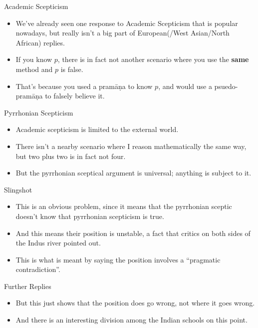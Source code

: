 \documentclass[
  17pt,
  letterpaper,
  ignorenonframetext,
  aspectratio=169,
]{beamer}
\providecommand{\tightlist}{%
  \setlength{\itemsep}{0pt}\setlength{\parskip}{0pt}}\usepackage{longtable,booktabs,array}
\begin{document}
\begin{frame}{Academic Scepticism}
\protect\hypertarget{academic-scepticism-1}{}
\begin{itemize}[<+->]
\tightlist
\item
  We've already seen one response to Academic Scepticism that is popular
  nowadays, but really isn't a big part of European(/West Asian/North
  African) replies.
\item
  If you know \(p\), there is in fact not another scenario where you use
  the \textbf{same} method and \(p\) is false.
\item
  That's because you used a pramāṇa to know \(p\), and would use a
  psuedo-pramāṇa to falsely believe it.
\end{itemize}
\end{frame}

\begin{frame}{Pyrrhonian Scepticism}
\protect\hypertarget{pyrrhonian-scepticism-1}{}
\begin{itemize}[<+->]
\tightlist
\item
  Academic scepticism is limited to the external world.
\item
  There isn't a nearby scenario where I reason mathematically the same
  way, but two plus two is in fact not four.
\item
  But the pyrrhonian sceptical argument is universal; anything is
  subject to it.
\end{itemize}
\end{frame}

\begin{frame}{Slingshot}
\protect\hypertarget{slingshot}{}
\begin{itemize}[<+->]
\tightlist
\item
  This is an obvious problem, since it means that the pyrrhonian sceptic
  doesn't know that pyrrhonian scepticism is true.
\item
  And this means their position is unstable, a fact that critics on both
  sides of the Indus river pointed out.
\item
  This is what is meant by saying the position involves a ``pragmatic
  contradiction''.
\end{itemize}
\end{frame}

\begin{frame}{Further Replies}
\protect\hypertarget{further-replies}{}
\begin{itemize}[<+->]
\tightlist
\item
  But this just shows that the position does go wrong, not where it goes
  wrong.
\item
  And there is an interesting division among the Indian schools on this
  point.
\end{itemize}
\end{frame}
\end{document}
